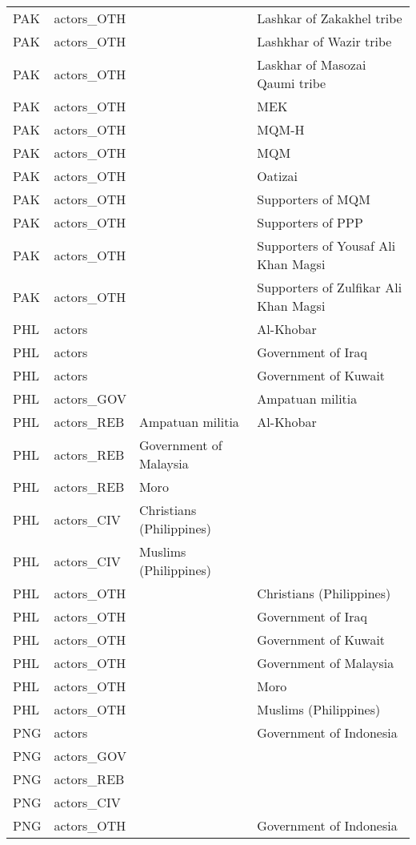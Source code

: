 \begin{table}[ht]
\begin{tabular}{llll}
  PAK & actors\_OTH &  & Lashkar of Zakakhel tribe \\ 
  PAK & actors\_OTH &  & Lashkhar of Wazir tribe \\ 
  PAK & actors\_OTH &  & Laskhar of Masozai Qaumi tribe \\ 
  PAK & actors\_OTH &  & MEK \\ 
  PAK & actors\_OTH &  & MQM-H \\ 
  PAK & actors\_OTH &  & MQM \\ 
  PAK & actors\_OTH &  & Oatizai \\ 
  PAK & actors\_OTH &  & Supporters of MQM \\ 
  PAK & actors\_OTH &  & Supporters of PPP \\ 
  PAK & actors\_OTH &  & Supporters of Yousaf Ali Khan Magsi \\ 
  PAK & actors\_OTH &  & Supporters of Zulfikar Ali Khan Magsi \\ 
  PHL & actors &  & Al-Khobar \\ 
  PHL & actors &  & Government of Iraq \\ 
  PHL & actors &  & Government of Kuwait \\ 
  PHL & actors\_GOV &  & Ampatuan militia \\ 
  PHL & actors\_REB & Ampatuan militia & Al-Khobar \\ 
  PHL & actors\_REB & Government of Malaysia &  \\ 
  PHL & actors\_REB & Moro &  \\ 
  PHL & actors\_CIV & Christians (Philippines) &  \\ 
  PHL & actors\_CIV & Muslims (Philippines) &  \\ 
  PHL & actors\_OTH &  & Christians (Philippines) \\ 
  PHL & actors\_OTH &  & Government of Iraq \\ 
  PHL & actors\_OTH &  & Government of Kuwait \\ 
  PHL & actors\_OTH &  & Government of Malaysia \\ 
  PHL & actors\_OTH &  & Moro \\ 
  PHL & actors\_OTH &  & Muslims (Philippines) \\ 
  PNG & actors &  & Government of Indonesia \\ 
  PNG & actors\_GOV &  &  \\ 
  PNG & actors\_REB &  &  \\ 
  PNG & actors\_CIV &  &  \\ 
  PNG & actors\_OTH &  & Government of Indonesia \\ 

\end{tabular}
\end{table}
